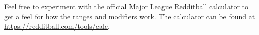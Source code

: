 
Feel free to experiment with the official Major League Redditball calculator
to get a feel for how the ranges and modifiers work.
The calculator can be found at \url{https://redditball.com/tools/calc}.



\pagebreak

\pagebreak

\pagebreak

